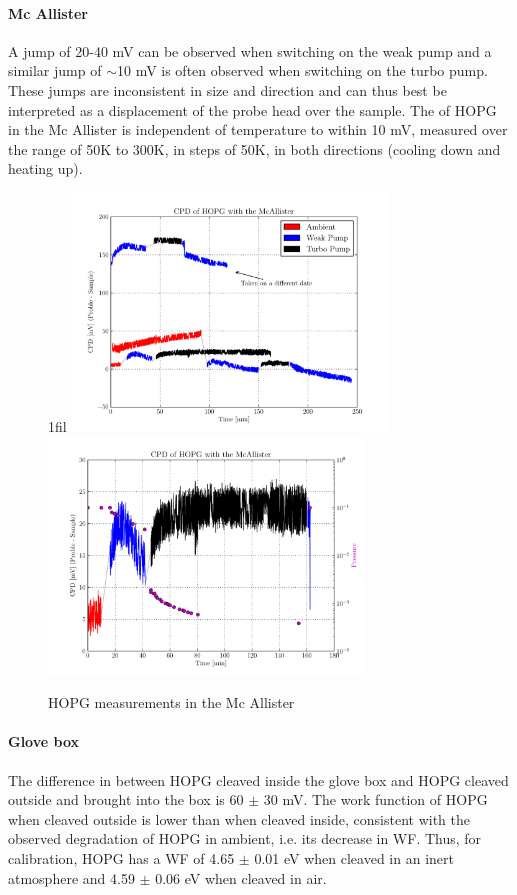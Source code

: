 \documentclass[a4paper,10pt]{article}
\makeatletter
\newcommand{\cpd}{\text{CPD}}
\newcommand{\McA}{Mc Allister}
\newcommand{\hopg}{HOPG}
\newcommand{\ie}{i.e.}
\newcommand{\wf}{WF}
\newcommand*{\centerfloat}{%
  \parindent \z@
  \leftskip \z@ \@plus 1fil \@minus \textwidth
  \rightskip\leftskip
  \parfillskip \z@skip}
\makeatother
\begin{document}
\paragraph{\McA{}}
A jump of 20-40 mV can be observed when switching on the weak pump and a similar jump of $\sim$10 mV is often observed when switching on the turbo pump. These jumps are inconsistent in size and direction and can thus best be interpreted as a displacement of the probe head over the sample. The \cpd{} of \hopg{} in the \McA{} is independent of temperature to within 10 mV, measured over the range of 50K to 300K, in steps of 50K, in both directions (cooling down and heating up).
\begin{figure}[h]
\centerfloat
	\includegraphics[width=0.75\textwidth]{HOPGMcA}
		\hspace{-0.08\textwidth}
	\includegraphics[width=0.75\textwidth]{HOPGMcAPres}
	\caption{\hopg{} measurements in the \McA{}}
		\label{fig:hopgmca}
\end{figure}
\paragraph{Glove box}
The difference in \cpd{} between \hopg{} cleaved inside the glove box and \hopg{} cleaved outside and brought into the box is 60 $\pm$ 30 mV. The work function of \hopg{} when cleaved outside is lower than when cleaved inside, consistent with the observed degradation of \hopg{} in ambient, \ie{} its decrease in \wf{}. Thus, for calibration, \hopg{} has a \wf{} of 4.65 $\pm$ 0.01 eV when cleaved in an inert atmosphere and 4.59 $\pm$ 0.06 eV when cleaved in air.\\
\end{document}
